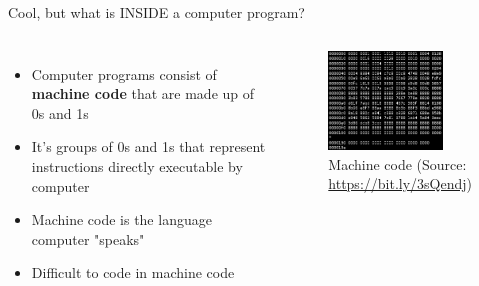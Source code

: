 \documentclass[10pt,xcolor={table,dvipsnames},t]{beamer}
\begin{document}
\begin{frame}{Cool, but what is INSIDE a computer program?}
  \begin{columns}
    \begin{itemize}
      \item Computer programs consist of \textbf{machine code} that are made up of 0s and 1s
      \item It's groups of 0s and 1s that represent instructions directly executable by computer
      \item Machine code is the language computer "speaks"
      \item Difficult to code in machine code
    \end{itemize}
  

    \begin{figure}
      \includegraphics[width=0.8\textwidth]{img/machine-code.png}
      \caption{Machine code (Source: \href{https://bit.ly/3sQendj}{https://bit.ly/3sQendj})}
      \label{fig:machine_code}
    \end{figure}
  \end{columns}

\end{frame}
\end{document}
